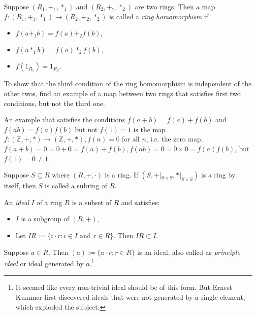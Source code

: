 \begin{definition}
    Suppose \((R_1, +_1, \ast_1)\) and \((R_2, +_2, \ast_2)\) are two rings. Then a map \(f : (R_1, +_1, \ast_1) \longrightarrow (R_2, +_2, \ast_2)\) is called a \textit{ring homomorphism} if 
    \begin{itemize}
        \item \(f(a +_1 b) = f(a) +_2 f(b)\),
        \item \(f(a \ast_1 b) = f(a) \ast_2 f(b)\),
        \item \(f(1_{R_1}) = 1_{R_2}\).
    \end{itemize}
\end{definition}
\begin{exercise}
    To show that the third condition of the ring homomorphism is independent of the other twos, find an example of a map between two rings that satisfies first two conditions, but not the third one.
\end{exercise}
\begin{answer}[Instructor]
    An example that satisfies the conditions \(f(a+b) = f(a)+f(b)\) and \(f(ab) = f(a)f(b)\) but not \(f(1) = 1\) is the map \(f : (\mathbb{Z}, +, *) \to (\mathbb{Z}, +, *), f(n) = 0\) for all \(n\), i.e. the zero map. \(f(a+b) = 0 = 0+0 = f(a) + f(b), f(ab) = 0 = 0 \times 0 = f(a) f(b)\), but \(f(1) = 0 \neq 1\). 
\end{answer}
\begin{definition}[Subring]
    Suppose \(S \subseteq R\) where \((R, +, \cdot)\) is a ring. If \((S, +|_{S \times S}, \ast|_{S \times S})\) is a ring by itself, then \(S\) is called a subring of \(R\).
\end{definition}
\begin{definition}[Ideal]
    An \textit{ideal} \(I\) of a ring \(R\) is a subset of \(R\) and satisfies:
    \begin{itemize}
        \item \(I\) is a subgroup of \((R, +)\),
        \item Let \(IR := \{i \cdot r : i \in I \text{ and } r \in R\}\). Then \(IR \subset I\).
    \end{itemize}
\end{definition}
\begin{example}
    Suppose \(a \in R\). Then \((a) := \{a \cdot r : r \in R\}\) is an ideal, also called as \textit{principle ideal} or ideal generated by \(a\).\footnote{It seemed like every non-trivial ideal should be of this form. But Ernest Kummer first discovered ideals that were not generated by a single element, which exploded the subject.}
\end{example}

